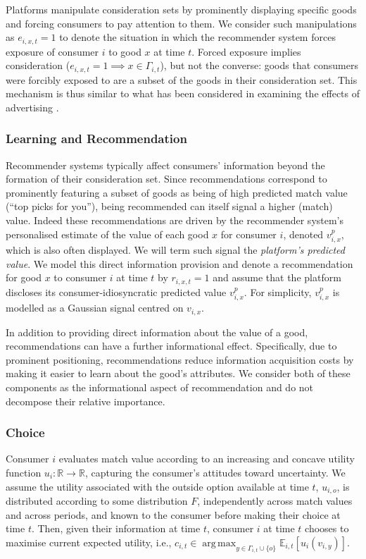 \documentclass[12pt]{article}
\DeclareMathOperator*{\argmax}{arg\,max}
\theoremstyle{newtheorem}
\begin{document}
Platforms manipulate consideration sets by prominently displaying specific goods and forcing consumers to pay attention to them. 
We consider such manipulations as $e_{i,x,t}=1$ to denote the situation in which the recommender system forces exposure of consumer $i$ to good $x$ at time $t$. 
Forced exposure implies consideration ($e_{i,x,t}=1 \implies x \in \Gamma_{i,t}$), but not the converse: goods that consumers were forcibly exposed to are a subset of the goods in their consideration set. 
This mechanism is thus similar to what has been considered in examining the effects of advertising \citep[see, e.g.,][]{Goeree2008Ecta}.


\subsubsection{Learning and Recommendation}
Recommender systems typically affect consumers' information beyond the formation of their consideration set. 
Since recommendations correspond to prominently featuring a subset of goods as being of high predicted match value (``top picks for you''), being recommended can itself signal a higher (match) value.
Indeed these recommendations are driven by the recommender system's personalised estimate of the value of each good $x$ for consumer $i$, denoted $v_{i,x}^p$, which is also often displayed.
We will term such signal the \emph{platform's predicted value}.
We model this direct information provision and denote a recommendation for good $x$ to consumer $i$ at time $t$ by $r_{i,x,t} = 1$ and assume that the platform discloses its consumer-idiosyncratic predicted value $v_{i,x}^p$. 
For simplicity, $v_{i,x}^p$ is modelled as a Gaussian signal centred on $v_{i,x}$. 


In addition to providing direct information about the value of a good, recommendations can have a further informational effect. 
Specifically, due to prominent positioning, recommendations reduce information acquisition costs by making it easier to learn about the good's attributes. We consider both of these components as the informational aspect of recommendation and do not decompose their relative importance.


\subsubsection{Choice}
Consumer $i$ evaluates match value according to an increasing and concave utility function $u_i:\mathbb R\to \mathbb R$, capturing the consumer's attitudes toward uncertainty.
We assume the utility associated with the outside option available at time $t$, $u_{i,o}$, is distributed according to some distribution $F$, independently across match values and across periods, and known to the consumer before making their choice at time $t$.
Then, given their information at time $t$, consumer $i$ at time $t$ chooses to maximise current expected utility, i.e., $\displaystyle c_{i,t}\in \argmax_{y \in \Gamma_{i,t}\cup \{o\}} \mathbb E_{i,t}[u_i(v_{i,y})]$.
\end{document}
